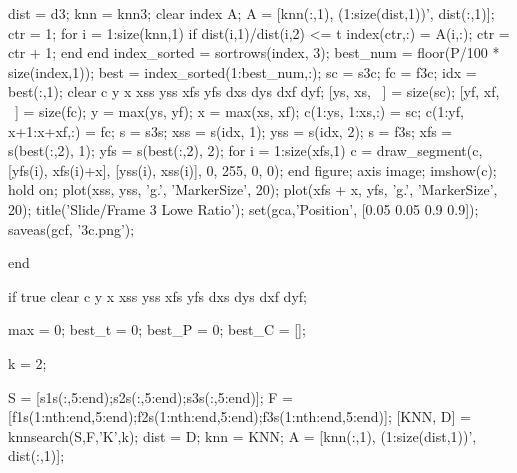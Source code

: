 dist = d3;
knn = knn3;
clear index A;
A = [knn(:,1), (1:size(dist,1))', dist(:,1)];
ctr = 1;
for i = 1:size(knn,1)
    if dist(i,1)/dist(i,2) <= t
        index(ctr,:) = A(i,:);
        ctr = ctr + 1;
    end
end
index_sorted = sortrows(index, 3);
best_num = floor(P/100 * size(index,1));
best = index_sorted(1:best_num,:);
sc = s3c;
fc = f3c;
idx = best(:,1);
clear c y x xss yss xfs yfs dxs dys dxf dyf;
[ys, xs, ~] = size(sc);
[yf, xf, ~] = size(fc);
y = max(ys, yf);
x = max(xs, xf);
c(1:ys, 1:xs,:) = sc;
c(1:yf, x+1:x+xf,:) = fc;
s = s3s;
xss = s(idx, 1);
yss = s(idx, 2);
s = f3s;
xfs = s(best(:,2), 1);
yfs = s(best(:,2), 2);
for i = 1:size(xfs,1)
    c = draw_segment(c, [yfs(i), xfs(i)+x], [yss(i), xss(i)], 0, 255, 0, 0);
end
figure;
axis image;
imshow(c);
hold on;
plot(xss, yss, 'g.', 'MarkerSize', 20);
plot(xfs + x, yfs, 'g.', 'MarkerSize', 20);
title('Slide/Frame 3 Lowe Ratio');
set(gca,'Position', [0.05 0.05 0.9 0.9]);
saveas(gcf, '3c.png');

end


if true
clear c y x xss yss xfs yfs dxs dys dxf dyf;


max = 0;
best_t = 0;
best_P = 0;
best_C = [];



k = 2;

S = [s1s(:,5:end);s2s(:,5:end);s3s(:,5:end)];
F = [f1s(1:nth:end,5:end);f2s(1:nth:end,5:end);f3s(1:nth:end,5:end)];
[KNN, D] = knnsearch(S,F,'K',k);
dist = D;
knn = KNN;
A = [knn(:,1), (1:size(dist,1))', dist(:,1)];

